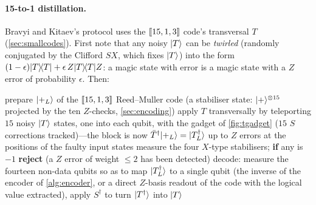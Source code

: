 \paragraph{15-to-1 distillation.} Bravyi and Kitaev's protocol \cite{bravyi-kitaev05} uses the $[\![15,1,3]\!]$ code's transversal $T$ (\cref{sec:smallcodes}). First note that any noisy $\lvert T \rangle$ can be \emph{twirled} (randomly conjugated by the Clifford $SX$, which fixes $\lvert T \rangle$) into the form $(1-\epsilon)\lvert T \rangle\!\langle T \rvert+\epsilon\,Z\lvert T \rangle\!\langle T \rvert Z$: a magic state with error is a magic state with a $Z$ error of probability $\epsilon$. Then:
\begin{algorithm}[H]
\caption{15-to-1 magic-state distillation}\label{alg:15to1}
\begin{algorithmic}[1]
\State prepare $\lvert +_L \rangle$ of the $[\![15,1,3]\!]$ Reed--Muller code (a stabiliser state: $\lvert + \rangle^{\otimes15}$ projected by the ten $Z$-checks, \cref{sec:encoding})
\State apply $T$ transversally by teleporting $15$ noisy $\lvert T \rangle$ states, one into each qubit, with the gadget of \cref{fig:tgadget} ($15$ $S$ corrections tracked)---the block is now $\bar T^\dagger\lvert +_L \rangle=\lvert T^\dagger_L \rangle$ up to $Z$ errors at the positions of the faulty input states
\State measure the four $X$-type stabilisers; \textbf{if} any is $-1$ \textbf{reject} (a $Z$ error of weight $\le2$ has been detected)
\State decode: measure the fourteen non-data qubits so as to map $\lvert T^\dagger_L \rangle$ to a single qubit (the inverse of the encoder of \cref{alg:encoder}, or a direct $Z$-basis readout of the code with the logical value extracted), apply $S^\dagger$ to turn $\lvert T^\dagger \rangle$ into $\lvert T \rangle$
\end{algorithmic}
\end{algorithm}
